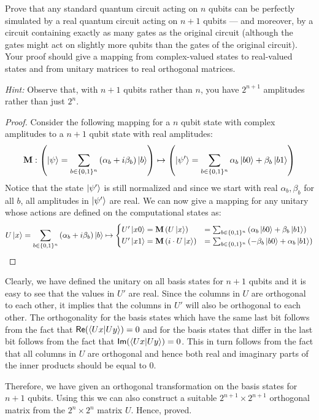 \begin{solution}[label=ques:3a]
  \begin{question}
    Prove that any standard quantum circuit acting on $n$ qubits can be perfectly simulated by a real quantum circuit acting on $n+1$ qubits --- and moreover, by a circuit containing exactly as many gates as the original circuit (although the gates might act on slightly more qubits than the gates of the original circuit). Your proof should give a mapping from complex-valued states to real-valued states and from unitary matrices to real orthogonal matrices.

\noindent \textit{Hint:} Observe that, with $n+1$ qubits rather than $n$, you have $2^{n+1}$ amplitudes rather than just $2^n$.
  \end{question}
  \tcblower{}
  \begin{proof}
    Consider the following mapping for a $n$ qubit state with complex amplitudes to a $n+1$ qubit state with real amplitudes:
    \begin{equation}
      \mathbf{M}:\left(\ket{\psi} = \sum_{b\in\{0, 1\}^n}\left(\alpha_b + i\beta_b\right)\ket{b}\right) \mapsto \left(\ket{\psi'} = \sum_{b\in\{0, 1\}^n}\alpha_b\ket{b0} + \beta_b\ket{b1}\right)
      \label{eq:complextoreal}
    \end{equation}
    Notice that the state $\ket{\psi'}$ is still normalized and since we start with real $\alpha_b, \beta_b$ for all $b$, all amplitudes in $\ket{\psi'}$ are real. We can now give a mapping for any unitary whose actions are defined on the computational states as:
    \begin{equation}
      U\ket{x} = \sum_{b\in\{0, 1\}^n}\left(\alpha_b + i\beta_b\right)\ket{b}
      \mapsto \begin{cases}
        U'\ket{x0} = \mathbf{M}\left(U\ket{x}\right) &= \sum_{b\in\{0, 1\}^n}\left(\alpha_b\ket{b0} + \beta_b\ket{b1}\right)\\
        U'\ket{x1} = \mathbf{M}\left(i\cdot U\ket{x}\right) &= \sum_{b\in\{0, 1\}^n}\left(-\beta_b\ket{b0} + \alpha_b\ket{b1}\right)
        \end{cases}
      \label{eq:complextorealunitary}
    \end{equation}
  \end{proof}
  Clearly, we have defined the unitary on all basis states for $n+1$ qubits and it is easy to see that the values in $U'$ are real. Since the columns in $U$ are orthogonal to each other, it implies that the columns in $U'$ will also be orthogonal to each other. The orthogonality for the basis states which have the same last bit follows from the fact that $\mathsf{Re}(\braket{Ux|Uy}) = 0$ and for the basis states that differ in the last bit follows from the fact that $\mathsf{Im}(\braket{Ux|Uy}) = 0$. This in turn follows from the fact that all columns in $U$ are orthogonal and hence both real and imaginary parts of the inner products should be equal to $0$.\par
  Therefore, we have given an orthogonal transformation on the basis states for $n+1$ qubits. Using this we can also construct a suitable $2^{n+1}\times 2^{n+1}$ orthogonal matrix from the $2^n\times 2^n$ matrix $U$. Hence, proved.
\end{solution}

